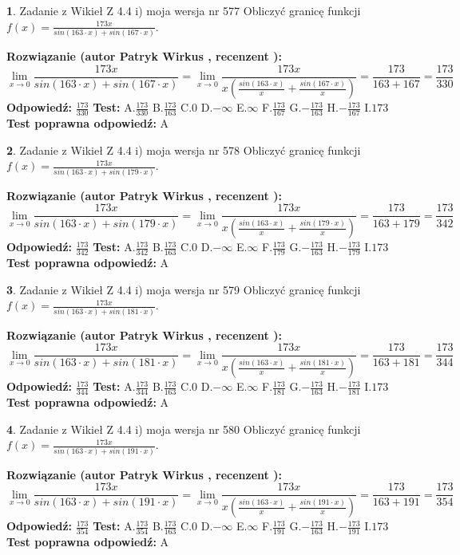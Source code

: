 \documentclass[12pt, a4paper]{article}
\theoremstyle{definition} %
\newtheorem{zad}{}
\newcommand{\zadStart}[1]{\begin{zad}#1\newline}
\newcommand{\zadStop}{\end{zad}}
\newcommand{\rozwStart}[2]{\noindent \textbf{Rozwiązanie (autor #1 , recenzent #2): }\newline}
\newcommand{\rozwStop}{\newline}
\newcommand{\odpStart}{\noindent \textbf{Odpowiedź:}\newline}
\newcommand{\odpStop}{\newline}
\newcommand{\testStart}{\noindent \textbf{Test:}\newline}
\newcommand{\testStop}{\newline}
\newcommand{\kluczStart}{\noindent \textbf{Test poprawna odpowiedź:}\newline}
\newcommand{\kluczStop}{\newline}
\begin{document}
\zadStart{Zadanie z Wikieł Z 4.4 i) moja wersja nr 577}
Obliczyć granicę funkcji $f(x)=\frac{173x}{sin(163\cdot x) +sin(167\cdot x)}$.
\zadStop
\rozwStart{Patryk Wirkus}{}
$$\lim\limits_{x\to 0}\frac{173x}{sin(163\cdot x) +sin(167\cdot x)}=\lim\limits_{x\to 0}\frac{173x}{x(\frac{sin(163\cdot x)}{x}+\frac{sin(167\cdot x)}{x})}=\frac{173}{163+167} = \frac{173}{330}$$
\rozwStop
\odpStart
$\frac{173}{330}$
\odpStop
\testStart
A.$\frac{173}{330}$
B.$\frac{173}{163}$
C.$0$
D.$-\infty$
E.$\infty$
F.$\frac{173}{167}$
G.$-\frac{173}{163}$
H.$-\frac{173}{167}$
I.$173$
\testStop
\kluczStart
A
\kluczStop



\zadStart{Zadanie z Wikieł Z 4.4 i) moja wersja nr 578}
Obliczyć granicę funkcji $f(x)=\frac{173x}{sin(163\cdot x) +sin(179\cdot x)}$.
\zadStop
\rozwStart{Patryk Wirkus}{}
$$\lim\limits_{x\to 0}\frac{173x}{sin(163\cdot x) +sin(179\cdot x)}=\lim\limits_{x\to 0}\frac{173x}{x(\frac{sin(163\cdot x)}{x}+\frac{sin(179\cdot x)}{x})}=\frac{173}{163+179} = \frac{173}{342}$$
\rozwStop
\odpStart
$\frac{173}{342}$
\odpStop
\testStart
A.$\frac{173}{342}$
B.$\frac{173}{163}$
C.$0$
D.$-\infty$
E.$\infty$
F.$\frac{173}{179}$
G.$-\frac{173}{163}$
H.$-\frac{173}{179}$
I.$173$
\testStop
\kluczStart
A
\kluczStop



\zadStart{Zadanie z Wikieł Z 4.4 i) moja wersja nr 579}
Obliczyć granicę funkcji $f(x)=\frac{173x}{sin(163\cdot x) +sin(181\cdot x)}$.
\zadStop
\rozwStart{Patryk Wirkus}{}
$$\lim\limits_{x\to 0}\frac{173x}{sin(163\cdot x) +sin(181\cdot x)}=\lim\limits_{x\to 0}\frac{173x}{x(\frac{sin(163\cdot x)}{x}+\frac{sin(181\cdot x)}{x})}=\frac{173}{163+181} = \frac{173}{344}$$
\rozwStop
\odpStart
$\frac{173}{344}$
\odpStop
\testStart
A.$\frac{173}{344}$
B.$\frac{173}{163}$
C.$0$
D.$-\infty$
E.$\infty$
F.$\frac{173}{181}$
G.$-\frac{173}{163}$
H.$-\frac{173}{181}$
I.$173$
\testStop
\kluczStart
A
\kluczStop



\zadStart{Zadanie z Wikieł Z 4.4 i) moja wersja nr 580}
Obliczyć granicę funkcji $f(x)=\frac{173x}{sin(163\cdot x) +sin(191\cdot x)}$.
\zadStop
\rozwStart{Patryk Wirkus}{}
$$\lim\limits_{x\to 0}\frac{173x}{sin(163\cdot x) +sin(191\cdot x)}=\lim\limits_{x\to 0}\frac{173x}{x(\frac{sin(163\cdot x)}{x}+\frac{sin(191\cdot x)}{x})}=\frac{173}{163+191} = \frac{173}{354}$$
\rozwStop
\odpStart
$\frac{173}{354}$
\odpStop
\testStart
A.$\frac{173}{354}$
B.$\frac{173}{163}$
C.$0$
D.$-\infty$
E.$\infty$
F.$\frac{173}{191}$
G.$-\frac{173}{163}$
H.$-\frac{173}{191}$
I.$173$
\testStop
\kluczStart
A
\kluczStop
\end{document}
